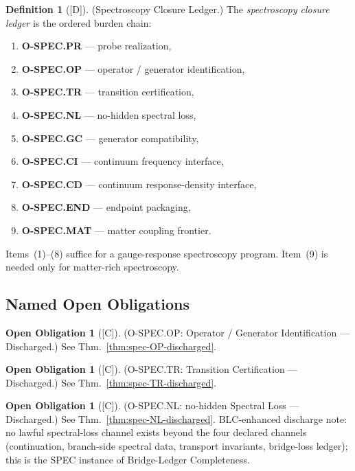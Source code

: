 \documentclass[12pt,oneside]{amsbook}
\theoremstyle{plain}
\theoremstyle{definition}
\newtheorem{definition}[theorem]{Definition}
\newtheorem{obligation}[theorem]{Open Obligation}
\theoremstyle{remark}
\newcommand{\status}[1]{\textup{[#1]}}
\begin{document}
\begin{definition}[\status{D}]\label{def:spec-closure-ledger}
\textup{(Spectroscopy Closure Ledger.)}
The \emph{spectroscopy closure ledger} is the ordered burden chain:
\begin{enumerate}[label=\textup{(\arabic*)}]
 \item \textbf{O-SPEC.PR} --- probe realization,
 \item \textbf{O-SPEC.OP} --- operator / generator identification,
 \item \textbf{O-SPEC.TR} --- transition certification,
 \item \textbf{O-SPEC.NL} --- no-hidden spectral loss,
 \item \textbf{O-SPEC.GC} --- generator compatibility,
 \item \textbf{O-SPEC.CI} --- continuum frequency interface,
 \item \textbf{O-SPEC.CD} --- continuum response-density interface,
 \item \textbf{O-SPEC.END} --- endpoint packaging,
 \item \textbf{O-SPEC.MAT} --- matter coupling frontier.
\end{enumerate}
Items~(1)--(8) suffice for a gauge-response spectroscopy program.
Item~(9) is needed only for matter-rich spectroscopy.
\end{definition}

\subsection{Named Open Obligations}\label{sec:spec-obligations}

\begin{obligation}[\status{C}]\label{ob:spec-OP}
\textup{(O-SPEC.OP: Operator / Generator Identification --- Discharged.)}
See Thm.~\ref{thm:spec-OP-discharged}.
\end{obligation}

\begin{obligation}[\status{C}]\label{ob:spec-TR}
\textup{(O-SPEC.TR: Transition Certification --- Discharged.)}
See Thm.~\ref{thm:spec-TR-discharged}.
\end{obligation}

\begin{obligation}[\status{C}]\label{ob:spec-NL}
\textup{(O-SPEC.NL: no-hidden Spectral Loss --- Discharged.)}
See Thm.~\ref{thm:spec-NL-discharged}. BLC-enhanced discharge note:
no lawful spectral-loss channel exists beyond the four declared channels
(continuation, branch-side spectral data, transport invariants, bridge-loss ledger);
this is the SPEC instance of Bridge-Ledger Completeness.
\end{obligation}
\end{document}
